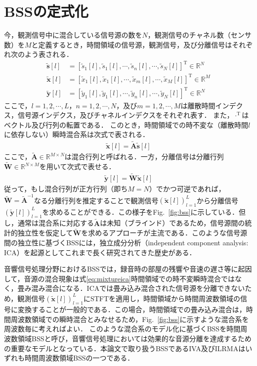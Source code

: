 \section{BSSの定式化}
\label{sec:conv:bssformularization}
今，観測信号中に混合している信号源の数を$N$，観測信号のチャネル数（センサ数）を$M$と定義するとき，時間領域の信号源，観測信号，及び分離信号はそれぞれ次のよう表される．
\begin{align}
  \tilde{\bm{s}}[l] &= [ \tilde{s}_{1}[l], \tilde{s}_{1}[l], \cdots, \tilde{s}_{n}[l], \cdots, \tilde{s}_{N}[l] ]^\mathrm{T} \in \mathbb{R}^{N} \\
  \tilde{\bm{x}}[l] &= [ \tilde{x}_{1}[l], \tilde{x}_{1}[l], \cdots, \tilde{x}_{m}[l], \cdots, \tilde{x}_{M}[l] ]^\mathrm{T} \in \mathbb{R}^{M} \\
  \tilde{\bm{y}}[l] &= [ \tilde{y}_{1}[l], \tilde{y}_{1}[l], \cdots, \tilde{y}_{n}[l], \cdots, \tilde{y}_{N}[l] ]^\mathrm{T} \in \mathbb{R}^{N} 
\end{align}
ここで，$l = 1, 2, \cdots, L$，$n = 1, 2, \cdots, N$，及び$m = 1, 2, \cdots, M$は離散時間インデクス，信号源インデクス，及びチャネルインデクスをそれぞれ表す．
また，$\cdot^\mathrm{T}$はベクトル及び行列の転置である．
このとき，時間領域での時不変な（離散時間$l$に依存しない）瞬時混合系は次式で表される．
\begin{align}
  \tilde{\bm{x}}[l] = \tilde{\bm{A}} \tilde{\bm{s}}[l] \label{eq:mixtureica}
\end{align}
ここで，$\tilde{\bm{A}} \in \mathbb{R}^{M\times N}$は混合行列と呼ばれる．一方，分離信号は分離行列$\tilde{\bm{W}} \in \mathbb{R}^{N\times M}$を用いて次式で表せる．
\begin{align}
  \tilde{\bm{y}}[l] = \tilde{\bm{W}} \tilde{\bm{x}}[l] 
\end{align}
従って，もし混合行列が正方行列（即ち$M=N$）でかつ可逆であれば，$\tilde{\bm{W}} = \tilde{\bm{A}}^{-1}$なる分離行列を推定することで観測信号$( \tilde{\bm{x}}[l] )_{l=1}^L$から分離信号$( \tilde{\bm{y}}[l] )_{l=1}^L$を求めることができる．この様子をFig.~\ref{fig:bss}に示している．但し，通常は混合系に対応する$\tilde{\bm{A}}$は未知（ブラインド）であるため，信号源間の統計的独立性を仮定して$\tilde{\bm{W}}$を求めるアプローチが主流である．このような信号源間の独立性に基づくBSSには，独立成分分析（independent component analysis: ICA）\cite{ica}を起源としてこれまで長く研究されてきた歴史がある．

{音響信号処理分野におけるBSSでは，録音時の部屋の残響や音速の遅さ等に起因して，音源の混合現象は式\eqref{eq:mixtureica}時間領域での時不変瞬時混合ではなく，畳み混み混合になる．ICAでは畳み込み混合された信号源を分離できないため，観測信号$( \tilde{\bm{x}}[l] )_{l=1}^L$にSTFTを適用し，時間領域から時間周波数領域の信号に変換することが一般的である．この場合，時間領域での畳み込み混合は，時間周波数領域での瞬時混合とみなせるため，Fig.~\ref{fig:bss}に示すような混合系を周波数毎に考えればよい．
このような混合系のモデル化に基づくBSSを時間周波数領域BSSと呼び，音響信号処理においては効果的な音源分離を達成するための重要なモデルとなっている．本論文で取り扱うBSSであるIVA及びILRMAはいずれも時間周波数領域BSSの一つである．}

